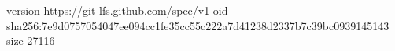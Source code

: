 version https://git-lfs.github.com/spec/v1
oid sha256:7e9d0757054047ee094cc1fe35cc55c222a7d41238d2337b7c39bc0939145143
size 27116
